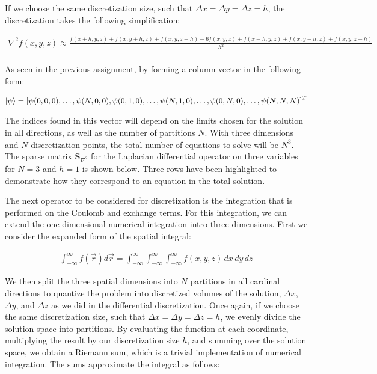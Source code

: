 \documentclass[10pt, oneside, letterpaper]{article}
\begin{document}
If we choose the same discretization size, such that $\Delta x = \Delta y = \Delta z = h$, the discretization takes the following simplification:

\begin{align*}
  \nabla^2f(x, y, z) \approx \frac{f(x+h,y,z) + f(x,y+h,z) + f(x,y,z+h) - 6f(x, y, z) + f(x-h,y,z) + f(x,y-h,z) + f(x,y,z-h)}{h^2}\\
\end{align*}

As seen in the previous assignment, by forming a column vector in the following form:

\begin{align*}
  \ket{\psi} = \left[\psi(0,0,0), \hdots ,\psi(N,0,0),\psi(0,1,0),\hdots,\psi(N,1,0),\hdots,\psi(0,N,0),\hdots,\psi(N,N,N)\right]^T
\end{align*}

The indices found in this vector will depend on the limits chosen for the solution in all directions, as well as the number of partitions $N$. With three dimensions and $N$ discretization points, the total number of equations to solve will be $N^3$. The sparse matrix $\bm{S}_{\nabla^2}$ for the Laplacian differential operator on three variables for $N=3$ and $h=1$ is shown below. Three rows have been highlighted to demonstrate how they correspond to an equation in the total solution.



The next operator to be considered for discretization is the integration that is performed on the Coulomb and exchange terms. For this integration, we can extend the one dimensional numerical integration intro three dimensions. First we consider the expanded form of the spatial integral:

\begin{align*}
  \int_{-\infty}^{\infty} f(\vec{r})d\vec{r} = \int_{-\infty}^{\infty}\int_{-\infty}^{\infty}\int_{-\infty}^{\infty}f(x,y,z)\,dx\,dy\,dz
\end{align*}

We then split the three spatial dimensions into $N$ partitions in all cardinal directions to quantize the problem into discretized volumes of the solution, $\Delta x$, $\Delta y$, and $\Delta z$ as we did in the differential discretization. Once again, if we choose the same discretization size, such that $\Delta x = \Delta y = \Delta z = h$, we evenly divide the solution space into partitions. By evaluating the function at each coordinate, multiplying the result by our discretization size $h$, and summing over the solution space, we obtain a Riemann sum, which is a trivial implementation of numerical integration. The sums approximate the integral as follows:
\end{document}
